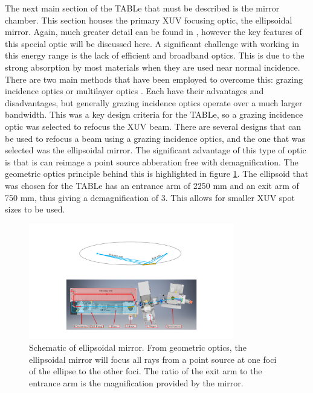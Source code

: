 The next main section of the TABLe that must be described is the mirror chamber.  This section houses the primary XUV focusing optic, the ellipsoidal mirror.  Again, much greater detail can be found in \cite{smithApplicationAttosecondTechniques2020}, however the key features of this special optic will be discussed here.  A significant challenge with working in this energy range is the lack of efficient and broadband optics.  This is due to the strong absorption by most materials when they are used near normal incidence.  There are two main methods that have been employed to overcome this: grazing incidence optics or multilayer optics \cite{attwoodSoftXraysExtreme2000}.  Each have their advantages and disadvantages, but generally grazing incidence optics operate over a much larger bandwidth.  This was a key design criteria for the TABLe, so a grazing incidence optic was selected to refocus the XUV beam.  There are several designs that can be used to refocus a beam using a grazing incidence optics, and the one that was selected was the ellipsoidal mirror.  The significant advantage of this type of optic is that is can reimage a point source abberation free with demagnification.  The geometric optics principle behind this is highlighted in figure \ref{fig:ellipsoid}.  The ellipsoid that was chosen for the TABLe has an entrance arm of 2250 mm and an exit arm of 750 mm, thus giving a demagnification of 3.  This allows for smaller XUV spot sizes to be used.
\begin{figure}
	\centering
	\includegraphics[width=0.8\textwidth]{figures/Beamline/ellipsoid.pdf}
	\caption[Schematic of ellipsoidal mirror]{Schematic of ellipsoidal mirror.  From geometric optics, the ellipsoidal mirror will focus all rays from a point source at one foci of the ellipse to the other foci.  The ratio of the exit arm to the entrance arm is the magnification provided by the mirror.}
	\label{fig:ellipsoid}
\end{figure}

